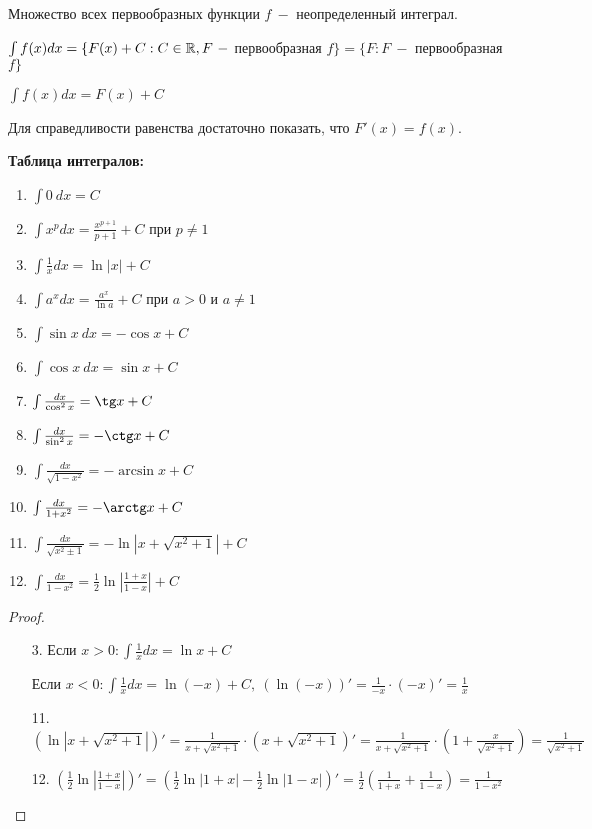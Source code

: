 \begin{definition}
    Множество всех первообразных функции $f\ -$ неопределенный интеграл.

    $\int f(x)dx=\{F(x)+C:C\in \mathbb{R},F\ - $ первообразная  $f\}=\{F:F\ - $ первообразная $ f \}$
\end{definition}

\begin{designation}
    $\int f(x)dx=F(x)+C$ 
\end{designation}

\begin{remark}
    Для справедливости равенства достаточно показать, что $F'(x)=f(x)$.
\end{remark}

\begin{statement}
    \textbf{Таблица интегралов:}
    \begin{enumerate}
        \item $\int 0\ dx= C$
        \item $\int x^p dx= \frac{x^{p+1}}{p+1}+C$ при $p\neq 1$
        \item $\int \frac{1}{x} dx= \ln|x| + C$
        \item $\int a^x dx= \frac{a^{x}}{\ln a}+C$ при $a>0$ и $a\neq 1$
        \item $\int \sin x\ dx= -\cos x+C$
        \item $\int \cos x\ dx= \sin x+ C$
        \item $\int \frac{dx}{\cos^2x}= \tg x + C$
        \item $\int \frac{dx}{\sin^2x}= -\ctg x + C$
        \item $\int \frac{dx}{\sqrt{1-x^2}}= -\arcsin x + C$
        \item $\int \frac{dx}{1+x^2}= -\arctg x + C$
        \item $\int \frac{dx}{\sqrt{x^2\pm1}}= -\ln|x+\sqrt{x^2+1}| + C$
        \item $\int \frac{dx}{1-x^2}= \frac{1}{2}\ln|\frac{1+x}{1-x}| + C$
    \end{enumerate}
\end{statement}

\begin{proof}
    \begin{enumerate}
        \item[]
        \item[3.] Если $x>0:\int \frac{1}{x} dx= \ln x + C$

        Если $x<0:\int \frac{1}{x} dx= \ln(-x) + C,\ (\ln(-x))'=\frac{1}{-x}\cdot(-x)'=\frac{1}{x}$
        \item[11.] $(\ln|x+\sqrt{x^2+1}|)'=\frac{1}{x+\sqrt{x^2+1}}\cdot(x+\sqrt{x^2+1})'=\frac{1}{x+\sqrt{x^2+1}}\cdot(1+\frac{x}{\sqrt{x^2+1}})=\frac{1}{\sqrt{x^2+1}}$
        \item[12.] $(\frac{1}{2}\ln|\frac{1+x}{1-x}|)'=(\frac{1}{2}\ln|1+x|-\frac{1}{2}\ln|1-x|)'=\frac{1}{2}(\frac{1}{1+x}+\frac{1}{1-x})=\frac{1}{1-x^2}$
    \end{enumerate}
\end{proof}

